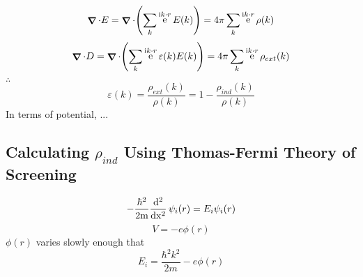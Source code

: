 \documentclass[UTF8]{ctexart} %
\DeclareMathOperator{\e}{\mathrm{e}}
\renewcommand{\I}{\mathrm{i}}
\DeclareMathOperator{\na}{\bm{\nabla}}
\DeclareMathOperator{\Tdv}{-\dfrac{\hbar^2}{2m}\dv[2]{x}}
\numberwithin{equation}{section}
\begin{document}
\begin{equation}\label{key}
\na \cdot E = \na \cdot \qty(\sum_k \e^{\I k\cdot r} E(k)) =  4\pi \sum_k \e^{\I k\cdot r} \rho(k)
\end{equation}
\begin{equation}\label{key}
\na\cdot D = \na\cdot \qty(\sum_k \e^{\I k\cdot r} \varepsilon(k) E(k)) = 4\pi \sum_k \e^{\I k\cdot r} \rho_{ext}(k)
\end{equation}
$ \therefore $
\begin{equation}\label{key}
\varepsilon(k) = \dfrac{\rho_{ext}(k)}{\rho(k)} = 1 - \dfrac{\rho_{ind}(k)}{\rho(k)}
\end{equation}
In terms of potential, ...\\

\subsection{Calculating $ \rho_{ind} $ Using Thomas-Fermi Theory of Screening}
\begin{equation}\label{key}
\Tdv \psi_i(r) = E_i \psi_i(r)
\end{equation}
\begin{equation}\label{key}
V = -e\phi(r)
\end{equation}
$ \phi(r) $ varies slowly enough that
\begin{equation}\label{key}
E_i = \dfrac{\hbar^2 k^2}{2m} - e\phi(r)
\end{equation}
\end{document}
